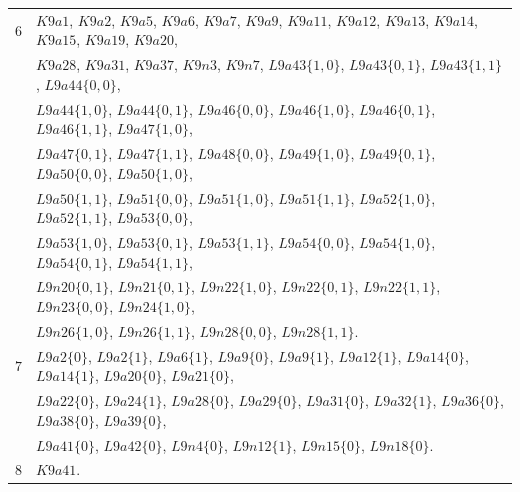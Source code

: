 \documentclass[pdftex, a4paper, 12pt, oneside]{amsart}
\numberwithin{equation}{section}
\theoremstyle{plain}
\theoremstyle{definition}
\begin{document}
\begin{footnotesize}
\begin{center}
\begin{longtable}[ht]{r||l}
				\\
				\hline
				$6$& $K9a1$, $K9a2$, $K9a5$, $K9a6$, $K9a7$, $K9a9$, $K9a11$, $K9a12$, $K9a13$, $K9a14$, $K9a15$, $K9a19$, $K9a20$, 
				\\
				& 
				$K9a28$, $K9a31$, $K9a37$, $K9n3$, $K9n7$, $L9a43\{1,0\}$, $L9a43\{0,1\}$, $L9a43\{1,1\}$, $L9a44\{0,0\}$,
				\\
				&
				$L9a44\{1,0\}$, $L9a44\{0,1\}$, $L9a46\{0,0\}$, $L9a46\{1,0\}$, $L9a46\{0,1\}$, $L9a46\{1,1\}$, $L9a47\{1,0\}$,
				\\
				&
				$L9a47\{0,1\}$, $L9a47\{1,1\}$, $L9a48\{0,0\}$, $L9a49\{1,0\}$, $L9a49\{0,1\}$, $L9a50\{0,0\}$, $L9a50\{1,0\}$,
				\\
				&
				$L9a50\{1,1\}$, $L9a51\{0,0\}$, $L9a51\{1,0\}$, $L9a51\{1,1\}$, $L9a52\{1,0\}$, $L9a52\{1,1\}$,  $L9a53\{0,0\}$,
				\\
				&
				$L9a53\{1,0\}$, $L9a53\{0,1\}$, $L9a53\{1,1\}$, $L9a54\{0,0\}$, $L9a54\{1,0\}$, $L9a54\{0,1\}$, $L9a54\{1,1\}$,
				\\
				&
				$L9n20\{0,1\}$, $L9n21\{0,1\}$, $L9n22\{1,0\}$, $L9n22\{0,1\}$, $L9n22\{1,1\}$, $L9n23\{0,0\}$, $L9n24\{1,0\}$,
				\\
				&
				$L9n26\{1,0\}$, $L9n26\{1,1\}$, $L9n28\{0,0\}$, $L9n28\{1,1\}$.
				\\
				\hline
				$7$& $L9a2\{0\}$, $L9a2\{1\}$, $L9a6\{1\}$, $L9a9\{0\}$, $L9a9\{1\}$, $L9a12\{1\}$, $L9a14\{0\}$, $L9a14\{1\}$, $L9a20\{0\}$, $L9a21\{0\}$,
				\\
				& 
				$L9a22\{0\}$, $L9a24\{1\}$, $L9a28\{0\}$, $L9a29\{0\}$, $L9a31\{0\}$, $L9a32\{1\}$, $L9a36\{0\}$, $L9a38\{0\}$, $L9a39\{0\}$,
				\\
				&
				$L9a41\{0\}$, $L9a42\{0\}$, $L9n4\{0\}$, $L9n12\{1\}$, $L9n15\{0\}$, $L9n18\{0\}$.
				\\
				\hline
				$8$&$K9a41$.
				\\
				\hline
			\end{longtable}
		\end{center}
		
	\end{footnotesize}
	
\end{document}
